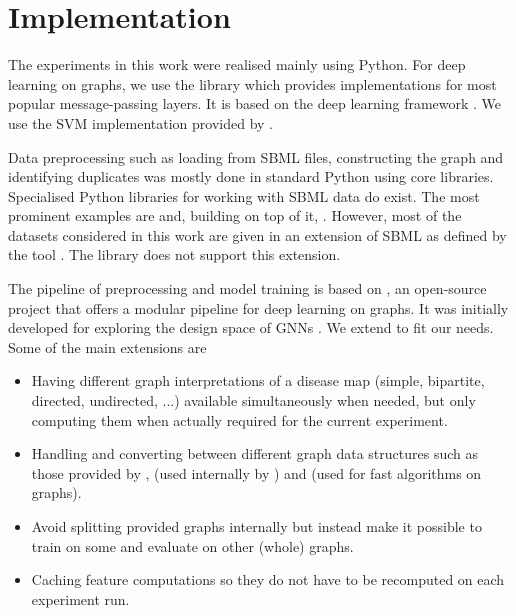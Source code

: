 \documentclass[
	fontsize=10pt, %
	twoside=true, %
	secnumdepth=1, %
  toc=indentunnumbered %
]{kaobook}
\begin{document}
\section{Implementation}

The experiments in this work were realised mainly using Python. For deep
learning on graphs, we use the library 
\cite{fey_FastGraphRepresentation_2019} which provides implementations for most
popular message-passing layers. It is based on the deep learning framework
 \cite{paszke_PyTorchImperativeStyle_2019}. We use the SVM
implementation provided by 
\cite{pedregosa_ScikitlearnMachineLearning_}.

Data preprocessing such as loading from SBML files, constructing the graph and
identifying duplicates was mostly done in standard Python using core libraries.
Specialised Python libraries for working with SBML data do exist. The most
prominent examples are 
\cite{bornstein_LibSBMLAPILibrary_2008} and, building on top of it,
 \cite{ebrahim_COBRApyCOnstraintsBasedReconstruction_2013}.
However, most of the datasets considered in this work are given in an extension
of SBML as defined by the tool . The 
library does not support this extension.

The pipeline of preprocessing and model training is based on 
\cite{noauthor_snap-stanfordgraphgym_2021}, an open-source project that offers a
modular pipeline for deep learning on graphs. It was initially developed for
exploring the design space of GNNs \cite{you_design_2020}. We extend
 to fit our needs. Some of the main extensions are
\begin{itemize}
\item Having different graph interpretations of a disease map (simple,
  bipartite, directed, undirected, ...) available simultaneously when needed,
  but only computing them when actually required for the current experiment.
\item Handling and converting between different graph data structures such as
  those provided by ,  (used internally by
  ) and  (used for fast algorithms on graphs).
\item Avoid splitting provided graphs internally but instead make it possible to
  train on some and evaluate on other (whole) graphs.
\item Caching feature computations so they do not have to be recomputed on each
  experiment run.
\end{itemize}
\end{document}
